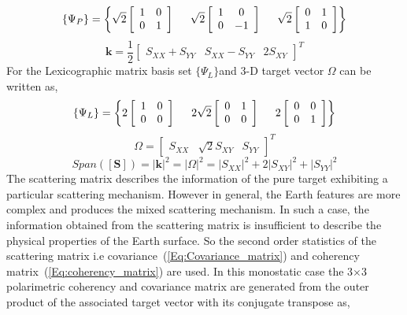 \begin{equation}
\{\Psi_P\}=\left\{\sqrt{2}\left[\begin{array}{cc}
1 & 0 \\
0 & 1 
\end{array} \right] \hspace{0.5cm}
\sqrt{2}\left[\begin{array}{cc}
1 & 0 \\
0 & -1
\end{array}\right] \hspace{0.5cm}
\sqrt{2}\left[\begin{array}{cc}
0 & 1 \\
1 & 0
\end{array}\right]
\right\}
\end{equation}
\begin{equation}
\bm{k}=\frac{1}{2}\left[\begin{array}{ccc}
S_{XX}+S_{YY} & S_{XX}-S_{YY} & 2S_{XY}
\end{array}
\right]^T
\end{equation}
For the Lexicographic matrix basis set $\{\Psi_L\}$and 3-D target vector $\bm{\varOmega}$ can be written as, 
\begin{equation}
\{\Psi_L\}=\left\{2\left[\begin{array}{cc}
1 & 0 \\
0 & 0 
\end{array} \right] \hspace{0.5cm}
2\sqrt{2}\left[\begin{array}{cc}
0 & 1 \\
0 & 0
\end{array}\right] \hspace{0.5cm}
2\left[\begin{array}{cc}
0 & 0 \\
0 & 1
\end{array}\right]
\right\}
\end{equation}
\begin{equation}
\bm{\varOmega}=\left[\begin{array}{ccc}
S_{XX} & \sqrt{2}S_{XY} & S_{YY}
\end{array}
\right]^T
\end{equation}
\begin{equation}
Span(\mathbf{[S]})=|\bm{k}|^2=|\bm{\varOmega}|^2= |S_{XX}|^2
+ 2|S_{XY}|^2 +|S_{YY}|^2
\end{equation}
The scattering matrix describes the information of the pure target exhibiting a particular scattering mechanism. However in general, the Earth features are more complex and produces the mixed scattering mechanism. In such a case, the information obtained from the scattering matrix is insufficient to describe the physical properties of the Earth surface. So the second order statistics of the scattering matrix i.e covariance~(\ref{Eq:Covariance_matrix}) and coherency matrix~(\ref{Eq:coherency_matrix}) are used. In this monostatic case the 3$\times$3 polarimetric coherency and covariance matrix are generated from the outer product of the associated target vector with its conjugate transpose as,

